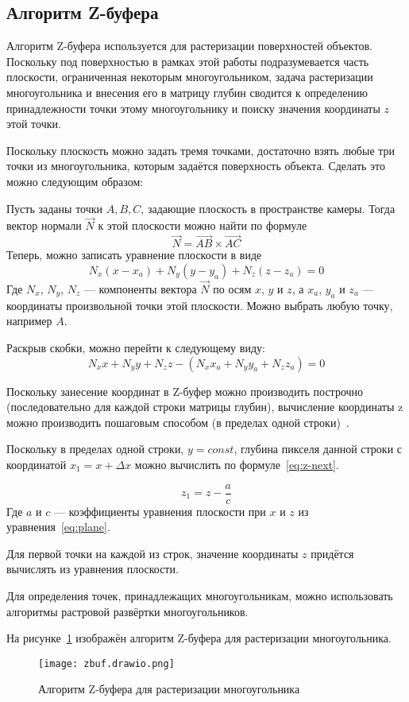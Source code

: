 \subsection{Алгоритм Z-буфера}

Алгоритм Z-буфера используется для растеризации поверхностей объектов. Поскольку под поверхностью в рамках этой работы подразумевается часть плоскости, ограниченная некоторым многоугольником, задача растеризации многоугольника и внесения его в матрицу глубин сводится к определению принадлежности точки этому многоугольнику и поиску значения координаты $z$ этой точки.

Поскольку плоскость можно задать тремя точками, достаточно взять любые три точки из многоугольника, которым задаётся поверхность объекта. Сделать это можно следующим образом:

Пусть заданы точки $A, B, C$, задающие плоскость в пространстве камеры. Тогда вектор нормали $\vec{N}$ к этой плоскости можно найти по формуле
$$ \vec{N} = \vec{AB} \times \vec{AC} $$
Теперь, можно записать уравнение плоскости в виде
$$ N_x(x-x_a) + N_y(y-y_a) + N_z(z-z_a) = 0 $$
Где $N_x$, $N_y$, $N_z$ --- компоненты вектора $\vec{N}$ по осям $x$, $y$ и $z$, а $x_a$, $y_a$ и $z_a$ --- координаты произвольной точки этой плоскости. Можно выбрать любую точку, например $A$.

Раскрыв скобки, можно перейти к следующему виду:
\begin{equation}
    N_xx + N_yy + N_zz - (N_xx_a + N_yy_a + N_zz_a) = 0
    \label{eq:plane}
\end{equation}

Поскольку занесение координат в Z-буфер можно производить построчно (последовательно для каждой строки матрицы глубин), вычисление координаты z можно производить пошаговым способом (в пределах одной строки)~\cite{Rogers}.

Поскольку в пределах одной строки, $y = const$, глубина пикселя данной строки с координатой $x_1 = x + \Delta x$ можно вычислить по формуле~\ref{eq:z-next}.

\begin{equation}
    z_1 = z - \frac{ a}{ c}
    \label{eq:z-next}
\end{equation}
Где $a$ и $c$ --- коэффициенты уравнения плоскости при $x$ и $z$ из уравнения~\ref{eq:plane}.

Для первой точки на каждой из строк, значение координаты $z$ придётся вычислять из уравнения плоскости.

Для определения точек, принадлежащих многоугольникам, можно использовать алгоритмы растровой развёртки многоугольников.

На рисунке~\ref{fig:z-buffer} изображён алгоритм Z-буфера для растеризации многоугольника.

\begin{figure}[h!]
    \centering
    \texttt{[image: zbuf.drawio.png]}
    \caption{Алгоритм Z-буфера для растеризации многоугольника}
    \label{fig:z-buffer}
\end{figure}